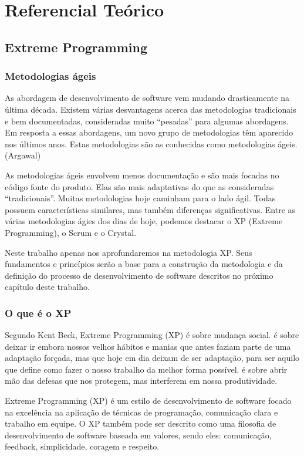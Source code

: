 \part{Referencial Teórico}

\chapter[Extreme Programming]{Extreme Programming}

\section{Metodologias ágeis}

As abordagem de desenvolvimento de software vem mudando drasticamente na última década. Existem várias desvantagens acerca das metodologias tradicionais e bem documentadas, consideradas muito “pesadas” para algumas abordagens. Em resposta a essas abordagens, um novo grupo de metodologias têm aparecido nos últimos anos. Estas metodologias são as conhecidas como metodologias ágeis. (Argawal)

As metodologias ágeis envolvem menos documentação e são mais focadas no código fonte do produto. Elas são mais adaptativas do que as consideradas “tradicionais”. Muitas metodologias hoje caminham para o lado ágil. Todas possuem características similares, mas também diferenças significativas. Entre as várias metodologias ágies dos dias de hoje, podemos destacar o XP (Extreme Programming), o Scrum e o Crystal.

Neste trabalho apenas nos aprofundaremos na metodologia XP. Seus fundamentos e princípios serão a base para a construção da metodologia e da definição do processo de desenvolvimento de software descritos no próximo capítulo deste trabalho.

\section{O que é o XP}

Segundo Kent Beck,  Extreme Programming (XP) é sobre mudança social. é sobre deixar ir embora nossos velhos hábitos e manias que antes faziam parte de uma adaptação forçada, mas que hoje em dia deixam de ser adaptação, para ser aquilo que define como fazer o nosso trabalho da melhor forma possível. é sobre abrir mão das defesas que nos protegem, mas interferem em nossa produtividade.

Extreme Programming (XP) é um estilo de desenvolvimento de software focado na excelência na aplicação de técnicas de programação, comunicação clara e trabalho em equipe. O XP também pode ser descrito como uma filosofia de desenvolvimento de software baseada em valores, sendo eles: comunicação, feedback, simplicidade, coragem e respeito.


